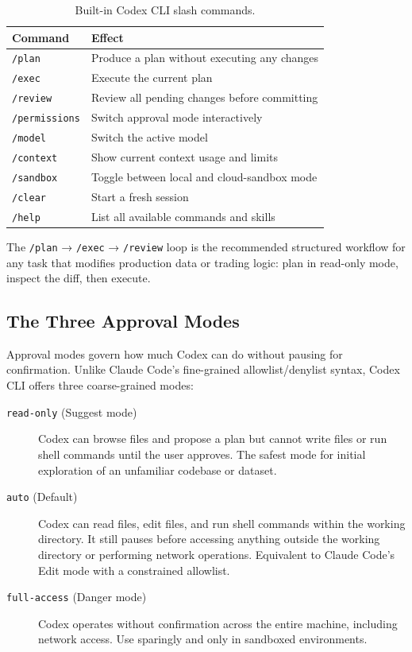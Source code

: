 \begin{table}[ht]
\centering
\caption{Built-in Codex CLI slash commands.}
\label{tab:codex-slash}
\begin{tabular}{ll}
\toprule
\textbf{Command} & \textbf{Effect} \\
\midrule
\texttt{/plan}        & Produce a plan without executing any changes \\
\texttt{/exec}        & Execute the current plan \\
\texttt{/review}      & Review all pending changes before committing \\
\texttt{/permissions} & Switch approval mode interactively \\
\texttt{/model}       & Switch the active model \\
\texttt{/context}     & Show current context usage and limits \\
\texttt{/sandbox}     & Toggle between local and cloud-sandbox mode \\
\texttt{/clear}       & Start a fresh session \\
\texttt{/help}        & List all available commands and skills \\
\bottomrule
\end{tabular}
\end{table}

The \texttt{/plan} → \texttt{/exec} → \texttt{/review} loop is the
recommended structured workflow for any task that modifies production data
or trading logic: plan in read-only mode, inspect the diff, then execute.

\subsection{The Three Approval Modes}
\label{app:codex:approval-modes}

Approval modes govern how much Codex can do without pausing for confirmation.
Unlike Claude Code's fine-grained allowlist/denylist syntax, Codex CLI offers
three coarse-grained modes:

\begin{description}
  \item[\texttt{read-only} (Suggest mode)] Codex can browse files and propose
        a plan but cannot write files or run shell commands until the user
        approves.  The safest mode for initial exploration of an unfamiliar
        codebase or dataset.

  \item[\texttt{auto} (Default)] Codex can read files, edit files, and run
        shell commands within the working directory.  It still pauses before
        accessing anything outside the working directory or performing network
        operations.  Equivalent to Claude Code's Edit mode with a constrained
        allowlist.

  \item[\texttt{full-access} (Danger mode)] Codex operates without
        confirmation across the entire machine, including network access.  Use
        sparingly and only in sandboxed environments.
\end{description}

